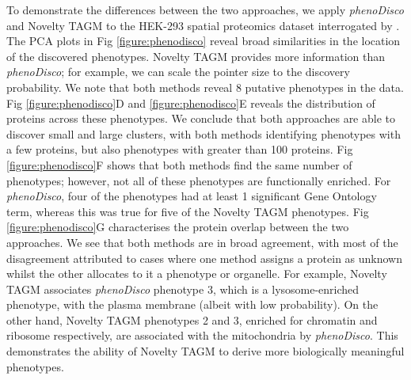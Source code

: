 \documentclass[12pt,english]{article}
\begin{document}
To demonstrate the differences between the two approaches, we apply \textit{phenoDisco} and Novelty TAGM to the HEK-293 spatial proteomics dataset interrogated by \cite{Breckels:2013}. The PCA plots in Fig \ref{figure:phenodisco} reveal broad similarities in the location of the discovered phenotypes. Novelty TAGM provides more information than \textit{phenoDisco}; for example, we can scale the pointer size to the discovery probability. We note that both methods reveal 8 putative phenotypes in the data. Fig \ref{figure:phenodisco}D and \ref{figure:phenodisco}E reveals the distribution of proteins across these phenotypes. We conclude that both approaches are able to discover small and large clusters, with both methods identifying phenotypes with a few proteins, but also phenotypes with greater than 100 proteins. Fig \ref{figure:phenodisco}F shows that both methods find the same number of phenotypes; however, not all of these phenotypes are functionally enriched. For \textit{phenoDisco}, four of the phenotypes had at least 1 significant Gene Ontology term, whereas this was true for five of the Novelty TAGM phenotypes. Fig \ref{figure:phenodisco}G characterises the protein overlap between the two approaches. We see that both methods are in broad agreement, with most of the disagreement attributed to cases where one method assigns a protein as unknown whilst the other allocates to it a phenotype or organelle. For example, Novelty TAGM associates \textit{phenoDisco} phenotype 3, which is a lysosome-enriched phenotype, with the plasma membrane (albeit with low probability). On the other hand, Novelty TAGM phenotypes 2 and 3, enriched for chromatin and ribosome respectively, are associated with the mitochondria by \textit{phenoDisco}. This demonstrates the ability of Novelty TAGM to derive more biologically meaningful phenotypes.
\end{document}
